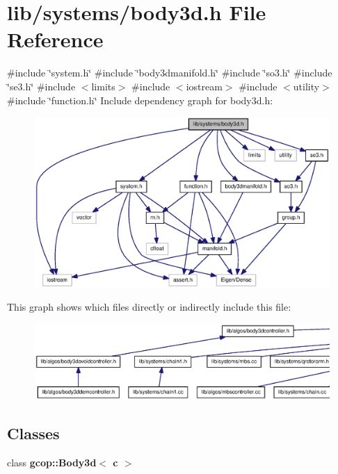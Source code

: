 \section{lib/systems/body3d.h \-File \-Reference}
\label{body3d_8h}
{\ttfamily \#include \char`\"{}system.\-h\char`\"{}}\*
{\ttfamily \#include \char`\"{}body3dmanifold.\-h\char`\"{}}\*
{\ttfamily \#include \char`\"{}so3.\-h\char`\"{}}\*
{\ttfamily \#include \char`\"{}se3.\-h\char`\"{}}\*
{\ttfamily \#include $<$limits$>$}\*
{\ttfamily \#include $<$iostream$>$}\*
{\ttfamily \#include $<$utility$>$}\*
{\ttfamily \#include \char`\"{}function.\-h\char`\"{}}\*
\-Include dependency graph for body3d.\-h\-:
\nopagebreak
\begin{figure}[H]
\begin{center}
\leavevmode
\includegraphics[width=350pt]{body3d_8h__incl}
\end{center}
\end{figure}
\-This graph shows which files directly or indirectly include this file\-:
\nopagebreak
\begin{figure}[H]
\begin{center}
\leavevmode
\includegraphics[width=350pt]{body3d_8h__dep__incl}
\end{center}
\end{figure}
\subsection*{\-Classes}
\begin{DoxyCompactItemize}
\item 
class {\bf gcop\-::\-Body3d$<$ c $>$}
\end{DoxyCompactItemize}
